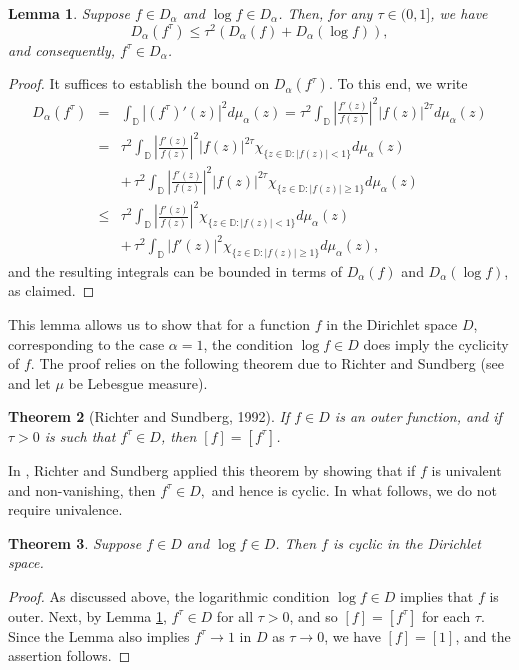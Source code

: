 \documentclass[11 pt,reqno]{amsart}
\newtheorem{thm}{Theorem}[section]
\newtheorem{lem}[thm]{Lemma}
\theoremstyle{definition}
\theoremstyle{remark}
\numberwithin{equation}{section} \numberwithin{figure}{section}
\newcommand{\DD}{{\mathbb D}}
\begin{document}
\begin{lem}\label{interpolation}
Suppose $f \in D_{\alpha}$ and $\log f \in D_{\alpha}$. Then, for any $\tau \in (0,1]$, we have
\[D_{\alpha}(f^{\tau})\leq {\tau}^2\left(D_{\alpha}(f)+D_{\alpha}(\log f)\right),\]
and consequently, $f^{\tau} \in D_{\alpha}$.
\end{lem}
\begin{proof}
It suffices to establish the bound on $D_{\alpha}(f^{\tau})$. To this end, we write
\begin{eqnarray*}
D_{\alpha}(f^{\tau}) &=&\int_{\DD}|(f^{\tau})'(z)|^2d\mu_{\alpha}(z)={\tau}^2\int_{\DD}\left|\frac{f'(z)}{f(z)}\right|^2|f(z)|^{2\tau}d\mu_{\alpha}(z)\\
&=&{\tau}^2\int_{\mathbb{\DD}}\left|\frac{f'(z)}{f(z)}\right|^2|f(z)|^{2\tau}\chi_{\{z\in\DD\colon |f(z)|< 1\}}d\mu_{\alpha}(z)\\
&&+\,{\tau}^2\int_{\DD}\left|\frac{f'(z)}{f(z)}\right|^2|f(z)|^{2\tau}\chi_{\{z\in\DD\colon |f(z)|\geq 1\}}d\mu_{\alpha}(z)\\
&\leq& {\tau}^2\int_{\DD}\left|\frac{f'(z)}{f(z)}\right|^2\chi_{\{z\in\DD\colon |f(z)|< 1\}}d\mu_{\alpha}(z)\\&&+\,
{\tau}^2\int_{\DD}|f'(z)|^2\chi_{\{z\in\DD\colon |f(z)|\geq 1\}}d\mu_{\alpha}(z),
\end{eqnarray*}
and the resulting integrals can be bounded in terms of $D_{\alpha}(f)$ and $D_{\alpha}(\log f)$, as claimed.
\end{proof}
This lemma allows us to show that for a function $f$ in the
Dirichlet space $D$, corresponding to the case $\alpha=1$, the
condition $\log f\in D$ does imply the cyclicity of $f$. The proof
relies on the following theorem due to Richter and Sundberg (see
\cite[Theorem 4.3]{RS92} and let $\mu$ be Lebesgue measure).

\begin{thm}[Richter and Sundberg, 1992]
If $f\in D$ is an outer function, and if $\tau>0$ is such that $f^{\tau}\in D$, then $[f]=[f^{\tau}]$.
\end{thm}

In \cite{RS92}, Richter and Sundberg applied this theorem by showing that if
$f$ is univalent and non-vanishing, then $f^\tau\in D,$ and hence is cyclic.
In what follows, we do not require univalence.

\begin{thm}\label{solvelog}
Suppose $f\in D$ and $\log f \in D$. Then $f$ is cyclic in the Dirichlet space.
\end{thm}
\begin{proof}
As discussed above, the logarithmic condition $\log f\in D$ implies that $f$ is outer. Next, by
Lemma \ref{interpolation}, $f^{\tau} \in D$ for all $\tau>0$, and so $[f]=[f^{\tau}]$ for each $\tau$. Since the Lemma also
implies $f^{\tau}\rightarrow 1$ in $D$ as $\tau\rightarrow 0$, we have $[f]=[1]$, and the assertion
follows.
\end{proof}
\end{document}
